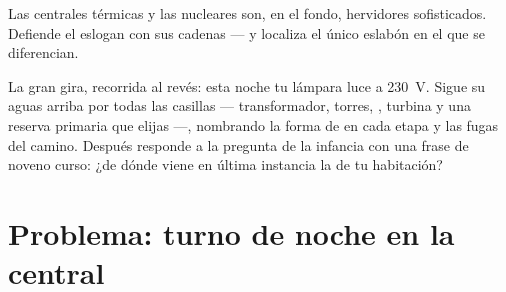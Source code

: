 \begin{exercise}[$\star\star$]\label{exo:g9:alternator:11}
Las centrales térmicas y las nucleares son, en el fondo, hervidores
sofisticados. Defiende el eslogan con sus cadenas --- y localiza el
único eslabón en el que se diferencian.
\end{exercise}

\begin{exercise}[$\star\star\star$]\label{exo:g9:alternator:12}
La gran gira, recorrida al revés: esta noche tu lámpara luce a
\qty{230}{V}. Sigue su  aguas arriba por todas las casillas
--- transformador, torres, , turbina y una reserva
primaria que elijas ---, nombrando la forma de  en cada
etapa y las fugas del camino. Después responde a la pregunta de la
infancia con una frase de noveno curso: ¿de dónde viene en última
instancia la  de tu habitación?
\end{exercise}

\section{Problema: turno de noche en la central}

